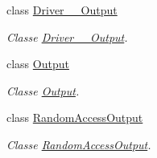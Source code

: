 \begin{DoxyCompactItemize}
class \hyperlink{classpersistencia_1_1output_1_1Driver____Output}{Driver\+\_\+\+\_\+\+Output}
\begin{DoxyCompactList}\small\item\em Classe \hyperlink{classpersistencia_1_1output_1_1Driver____Output}{Driver\+\_\+\+\_\+\+Output}. \end{DoxyCompactList}\item 
class \hyperlink{classpersistencia_1_1output_1_1Output}{Output}
\begin{DoxyCompactList}\small\item\em Classe \hyperlink{classpersistencia_1_1output_1_1Output}{Output}. \end{DoxyCompactList}\item 
class \hyperlink{classpersistencia_1_1output_1_1RandomAccessOutput}{Random\+Access\+Output}
\begin{DoxyCompactList}\small\item\em Classe \hyperlink{classpersistencia_1_1output_1_1RandomAccessOutput}{Random\+Access\+Output}. \end{DoxyCompactList}\end{DoxyCompactItemize}

